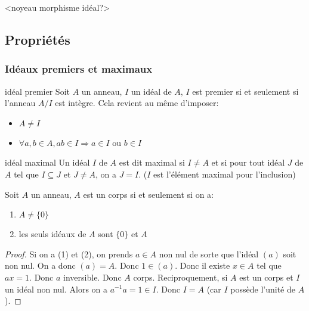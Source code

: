 <noyeau morphisme idéal?>



\subsection{Propriétés}

\subsubsection{Idéaux premiers et maximaux}

\begin{definition}{idéal premier}{}
    Soit $A$ un anneau, $I$ un idéal de $A$, $I$ est premier si et seulement si l'anneau $A/I$ est intègre.
    Cela revient au même d'imposer:
    \begin{itemize}
        \item $A \neq I$
        \item $\forall a, b \in A, ab \in I \Longrightarrow a \in I$ ou $ b \in I$
    \end{itemize}
\end{definition}

\begin{definition}{idéal maximal}{}
    Un idéal $I$ de $A$ est dit maximal si $I \neq A$ et si pour tout idéal $J$ de $A$ tel que $I \subseteq J$ et $J \neq A$, on a $J = I$.
    ($I$ est l'élément maximal pour l'inclusion)
\end{definition}

\begin{lemma}{}{}
    Soit $A$ un anneau, $A$ est un corps si et seulement si on a:
    \begin{enumerate}[(1)]
        \item $A \neq \{0\}$
        \item les seuls idéaux de $A$ sont $\{0\}$ et $A$
    \end{enumerate}
\end{lemma}

\begin{proof}
    Si on a (1) et (2), on prends $a \in A$ non nul de sorte que l'idéal $(a)$
    soit non nul. On a donc $(a) = A$. Donc $1 \in (a)$. Donc il existe $x \in A$
    tel que $ax = 1$. Donc $a$ inversible. Donc $A$ corps. \newline
    Reciproquement, si $A$ est un corps et $I$ un idéal non nul. Alors on a $a^{-1}a = 1 \in I$.
    Donc $I = A$ (car $I$ possède l'unité de $A$).
\end{proof}

